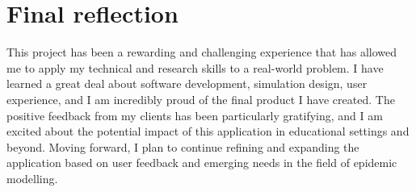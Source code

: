 \section{Final reflection}
This project has been a rewarding and challenging experience that has allowed me to apply my technical and research skills to a real-world problem. I have learned a great deal about software development, simulation design, user experience, and I am incredibly proud of the final product I have created. The positive feedback from my clients has been particularly gratifying, and I am excited about the potential impact of this application in educational settings and beyond. Moving forward, I plan to continue refining and expanding the application based on user feedback and emerging needs in the field of epidemic modelling.